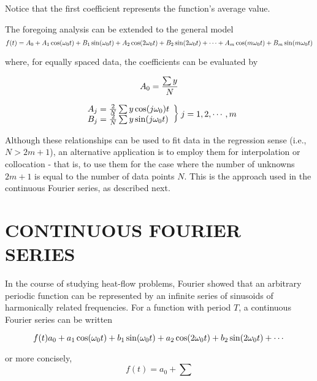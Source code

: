 \documentclass[../main.tex]{subfiles}
\begin{document}
\noindent Notice that the first coefficient represents the function's average value.


The foregoing analysis can be extended to the general model
\begin{equation}
	\notag
	f(t) = A_0 + A_1 \cos(\omega_0 t) + B_1 \sin(\omega_0 t) + A_2 \cos(2 \omega_0 t) + B_2 \sin(2 \omega_0 t) + \cdots + A_m \cos(m \omega_0 t) + B_m \sin(m \omega_0 t)
\end{equation}

\noindent where, for equally spaced data, the coefficients can be evaluated by

\begin{equation}
	\notag
	A_0 = \frac{\sum y}{N}
\end{equation}

\begin{equation}
	\notag
	\left.
		\begin{array}{ll}
			A_j = \frac{2}{N} \sum y \cos(j \omega_0) t \\
			B_j = \frac{2}{N} \sum y \sin(j \omega_0 t)
		\end{array}
	\right \} j = 1,2, \dotsb , m
\end{equation}

Although these relationships can be used to fit data in the regression sense (i.e.,$N  > 2 m + 1$), an alternative application is to employ them for interpolation or collocation - that
is, to use them for the case where the number of unknowns $2m + 1$ is equal to the number
of data points $N$. This is the approach used in the continuous Fourier series, as described
next.

\label{cha:cha_P_16_2}
\section{CONTINUOUS FOURIER SERIES}

In the course of studying heat-flow problems, Fourier showed that an arbitrary periodic
function can be represented by an infinite series of sinusoids of harmonically related
frequencies. For a function with period $T$, a continuous Fourier series can be written

\begin{equation}
	\notag
	f(t) a_0 + a_1 \cos(\omega_0 t) + b_1 \sin(\omega_0 t) +  a_2 \cos(2 \omega_0 t) + b_2 \sin(2 \omega_0 t) + \cdots
\end{equation}

\noindent or more concisely,
\begin{equation}
	\tag{16.17}
	f(t) = a_0 + \sum
\end{equation}
\end{document}
